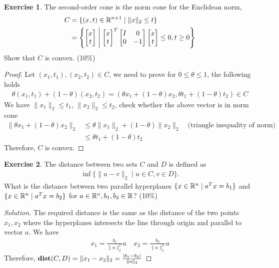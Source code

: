 \documentclass[12pt]{extarticle}
\theoremstyle{definition}
\newtheorem{exercise}{Exercise}
\begin{document}
\begin{exercise}
  The second-order cone is the norm cone for the Euclidean norm, \ie
  \begin{align*}
    C &= \{(x, t)\in\mathbb{R}^{n+1}\mid \|x\|_2\le t\}\\
      &= \left\{
        \begin{bmatrix}
          x\\t
        \end{bmatrix}
        \;\middle|\;
        \begin{bmatrix}
          x\\t
        \end{bmatrix}^T
        \begin{bmatrix}
          I & 0\\
          0 & -1
        \end{bmatrix}
        \begin{bmatrix}
          x\\t
        \end{bmatrix}\le 0, t\ge 0\right\}
  \end{align*}
  Show that $C$ is convex. (10\%)
\end{exercise}
\begin{proof}
  Let $(x_1, t_1), (x_2, t_2) \in C$, we need to prove for $0\le\theta\le 1$, the following holds
  \begin{align*}
    \theta (x_1, t_1)+(1-\theta)(x_2, t_2)=(\theta x_1+(1-\theta)x_2, \theta t_1+(1-\theta)t_2)\in C
  \end{align*}
  We have $\|x_1\|_2\le t_1$, $\|x_2\|_2\le t_2$, check whether the above vector is in norm cone
  \begin{align*}
    \|\theta x_1+(1-\theta)x_2\|_2
        &\le \theta\|x_1\|_2+(1-\theta)\|x_2\|_2\quad\text{(triangle inequality of norm)}\\
        &\le \theta t_1+(1-\theta)t_2
  \end{align*}
  Therefore, $C$ is convex.
\end{proof}

\begin{exercise}
  The distance between two sets $C$ and $D$ is defined as
  \begin{align*}
    \inf\{\|u-v\|_2\mid u\in C, v\in D\}.
  \end{align*}
  What is the distance between two parallel hyperplanes $\{x\in\mathbb{R}^n\mid a^Tx=b_1\}$ and $\{x\in\mathbb{R}^n\mid a^Tx=b_2\}$ for $a\in\mathbb{R}^n, b_1, b_2\in\mathbb{R}$? (10\%)
\end{exercise}
\begin{proof}[Solution]
  \let\qed\relax
  The required distance is the same as the distance of the two points $x_1, x_2$ where the hyperplanes intersects the line through origin and parallel to vector $a$. We have
  \begin{align*}
    x_1=\frac{b_1}{\|a\|_2^2}a\quad x_2=\frac{b_2}{\|a\|_2^2}a
  \end{align*}
  Therefore, $\mathop{\bf dist{}}(C, D)=\|x_1-x_2\|_2=\frac{|b_1-b_2|}{\|a\|_2}$
\end{proof}
\end{document}
